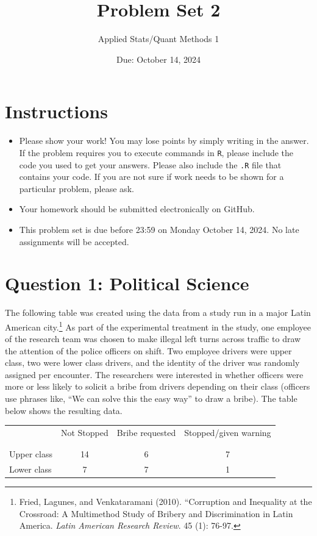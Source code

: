 \documentclass[12pt,letterpaper]{article}
\title{Problem Set 2}
\date{Due: October 14, 2024}
\author{Applied Stats/Quant Methods 1}
\begin{document}
	\maketitle
	\section*{Instructions}
\begin{itemize}
	\item Please show your work! You may lose points by simply writing in the answer. If the problem requires you to execute commands in \texttt{R}, please include the code you used to get your answers. Please also include the \texttt{.R} file that contains your code. If you are not sure if work needs to be shown for a particular problem, please ask.
	\item Your homework should be submitted electronically on GitHub.
	\item This problem set is due before 23:59 on Monday October 14, 2024. No late assignments will be accepted.

\end{itemize}

	
	\vspace{.5cm}
	\section*{Question 1: Political Science}
		\vspace{.25cm}
	The following table was created using the data from a study run in a major Latin American city.\footnote{Fried, Lagunes, and Venkataramani (2010). ``Corruption and Inequality at the Crossroad: A Multimethod Study of Bribery and Discrimination in Latin America. \textit{Latin American Research Review}. 45 (1): 76-97.} As part of the experimental treatment in the study, one employee of the research team was chosen to make illegal left turns across traffic to draw the attention of the police officers on shift. Two employee drivers were upper class, two were lower class drivers, and the identity of the driver was randomly assigned per encounter. The researchers were interested in whether officers were more or less likely to solicit a bribe from drivers depending on their class (officers use phrases like, ``We can solve this the easy way'' to draw a bribe). The table below shows the resulting data.

\newpage
\begin{table}[h!]
	\centering
	\begin{tabular}{l | c c c }
		& Not Stopped & Bribe requested & Stopped/given warning \\
		\\[-1.8ex] 
		\hline \\[-1.8ex]
		Upper class & 14 & 6 & 7 \\
		Lower class & 7 & 7 & 1 \\
		\hline
	\end{tabular}
\end{table}
\end{document}
